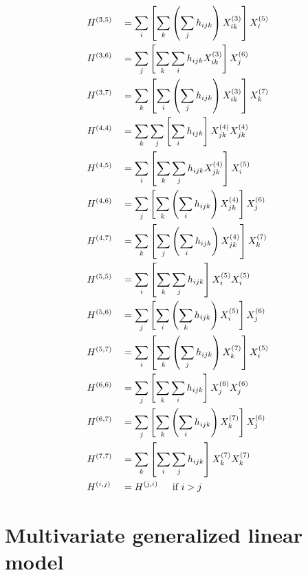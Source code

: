 \documentclass[12pt]{article}
\begin{document}
\begin{itemize}
\begin{multicols}{2}
\begin{equation*}
	\begin{aligned}
		& H^{(3,5)} && = \sum_{i} \left[ \sum_{k} \left( \sum_{j} h_{ijk} \right) X^{(3)}_{ik} \right] X^{(5)}_{i} \\
		& H^{(3,6)} && = \sum_{j} \left[ \sum_{k} \sum_{i} h_{ijk} X^{(3)}_{ik} \right] X^{(6)}_{j} \\
		& H^{(3,7)} && = \sum_{k} \left[ \sum_{i} \left( \sum_{j} h_{ijk} \right) X^{(3)}_{ik} \right] X^{(7)}_{k} \\
		& H^{(4,4)} && = \sum_{k} \sum_{j} \left[ \sum_{i}  h_{ijk} \right] X^{(4)}_{jk} X^{(4)}_{jk} \\
		& H^{(4,5)} && = \sum_{i} \left[ \sum_{k} \sum_{j} h_{ijk} X^{(4)}_{jk} \right] X^{(5)}_{i} \\
		& H^{(4,6)} && = \sum_{j} \left[ \sum_{k} \left( \sum_{i} h_{ijk} \right) X^{(4)}_{jk} \right] X^{(6)}_{j} \\
		& H^{(4,7)} && = \sum_{k} \left[ \sum_{j} \left( \sum_{i} h_{ijk} \right) X^{(4)}_{jk} \right] X^{(7)}_{k}  \\
		& H^{(5,5)} && = \sum_{i} \left[ \sum_{k} \sum_{j} h_{ijk} \right] X^{(5)}_{i} X^{(5)}_{i} \\
		& H^{(5,6)} && = \sum_{j} \left[ \sum_{i} \left( \sum_{k} h_{ijk} \right) X^{(5)}_{i} \right] X^{(6)}_{j} \\
		& H^{(5,7)} && = \sum_{i} \left[ \sum_{k}  \left( \sum_{j} h_{ijk} \right) X^{(7)}_{k} \right] X^{(5)}_{i} \\
		& H^{(6,6)} && = \sum_{j} \left[ \sum_{k} \sum_{i} h_{ijk} \right] X^{(6)}_{j} X^{(6)}_{j} \\
		& H^{(6,7)} && = \sum_{j} \left[ \sum_{k} \left( \sum_{i} h_{ijk} \right) X^{(7)}_{k} \right] X^{(6)}_{j} \\
		& H^{(7,7)} && = \sum_{k} \left[ \sum_{i} \sum_{j} h_{ijk} \right] X^{(7)}_{k} X^{(7)}_{k} \\
		& H^{(i,j)} && = H^{(j,i)} \hspace*{15pt} \text{if } i > j \\
	\end{aligned}
	\end{equation*}
\end{multicols}

\end{itemize}


\section{Multivariate generalized linear model}
\end{document}
